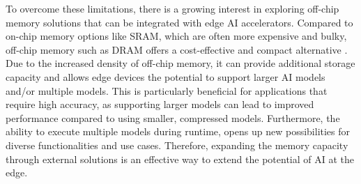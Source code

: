 To overcome these limitations, there is a growing interest in exploring off-chip memory solutions that can be integrated with edge AI accelerators.
Compared to on-chip memory options like SRAM, which are often more expensive and bulky, off-chip memory such as DRAM offers a cost-effective and compact alternative \cite{hennessyComputerArchitectureSixth2017}.
Due to the increased density of off-chip memory, it can provide additional storage capacity and allows edge devices the potential to support larger AI models and/or multiple models.
This is particularly beneficial for applications that require high accuracy, as supporting larger models can lead to improved performance compared to using smaller, compressed models.
Furthermore, the ability to execute multiple models during runtime, opens up new possibilities for diverse functionalities and use cases.
Therefore, expanding the memory capacity through external solutions is an effective way to extend the potential of AI at the edge.
